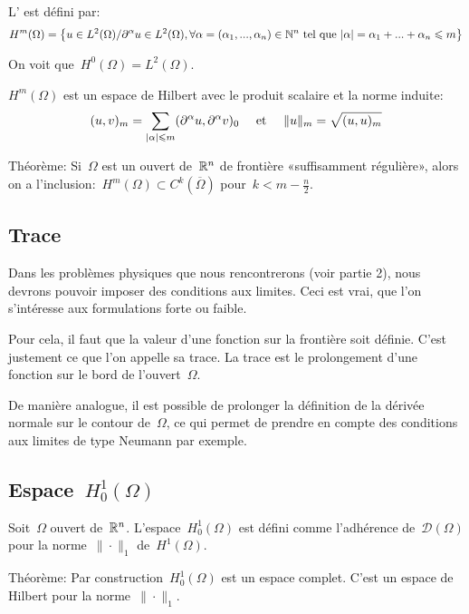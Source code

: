 L' est défini par:
\[
H^m(\Omega)=\left\{u\in L^2(\Omega)/ \partial^\alpha u\in L^2(\Omega),
\forall\alpha=(\alpha_1, ..., \alpha_n)\in\mathbb N^n \text{ tel que } |\alpha|=\alpha_1+...+\alpha_n\leqslant m
\right\}
\]

On voit que~$H^0(\Omega)=L^2(\Omega)$.

\medskip
$H^m(\Omega)$ est un espace de Hilbert avec le produit scalaire et la norme induite:
\[
(u,v)_m=\displaystyle\sum_{|\alpha|\leqslant m}(\partial^\alpha u,\partial^\alpha v)_0 
\quad \text{ et } \quad
\|u\|_m=\sqrt{(u,u)_m}
\]

Théorème: Si~$\Omega$ est un ouvert de~$\mathbb R^n$ de frontière «suffisamment régulière», alors on a l'inclusion:~$H^m(\Omega)\subset C^k(\overline{\Omega})$ pour~$k<m-\frac{n}2$.

\medskip
\subsection*{Trace}

Dans les problèmes physiques que nous rencontrerons (voir partie 2), nous devrons pouvoir imposer des conditions aux limites. Ceci est vrai, que l'on s'intéresse aux formulations forte ou faible.

Pour cela, il faut que la valeur d'une fonction sur la frontière soit définie. C'est justement ce que l'on appelle sa trace. La trace est le prolongement d'une fonction sur le bord de l'ouvert~$\Omega$.

De manière analogue, il est possible de prolonger la définition de la dérivée normale sur le contour de~$\Omega$, ce qui permet de prendre en compte des conditions aux limites de type Neumann par exemple.


\medskip
\subsection*{Espace~$H^1_0(\Omega)$}

Soit~$\Omega$ ouvert de~$\mathbb R^n$. 
L'espace~$H^1_0(\Omega)$ est défini comme l'adhérence de~$\mathcal{D}(\Omega)$
pour la norme~$\|\cdot\|_ 1$ de~$H^1(\Omega)$.

\medskip
Théorème: Par construction~$H^1_0(\Omega)$ est un espace complet. 
C'est un espace de Hilbert pour la norme~$\|\cdot\|_ 1$.

